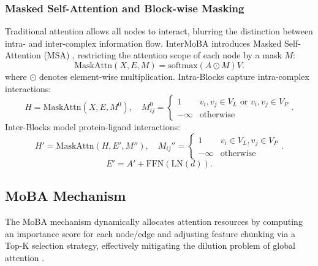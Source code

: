 \documentclass[11pt,a4paper]{article}
\theoremstyle{plain}
\theoremstyle{definition}
\begin{document}
\subsubsection{Masked Self-Attention and Block-wise Masking}
Traditional attention allows all nodes to interact, blurring the distinction between intra- and inter-complex information flow. InterMoBA introduces Masked Self-Attention (MSA) \cite{lee2018pre}, restricting the attention scope of each node by a mask $M$:
\begin{equation}
\text{MaskAttn}(X,E,M) = \text{softmax}(A \odot M)V.
\end{equation}
where $\odot$ denotes element-wise multiplication. Intra-Blocks capture intra-complex interactions:
\begin{equation}
H = \text{MaskAttn}(X,E,M^{0}),\quad
M_{ij}^{0} = \begin{cases} 1 & v_i,v_j \in V_L \text{ or } v_i,v_j \in V_P \\ -\infty & \text{otherwise} \end{cases}.
\end{equation}
Inter-Blocks model protein-ligand interactions:
\begin{equation}
H' = \text{MaskAttn}(H,E',M''),\quad
M_{ij}'' = \begin{cases} 1 & v_i \in V_L, v_j \in V_P \\ -\infty & \text{otherwise} \end{cases}.
\end{equation}
\begin{equation}
E' = A' + \text{FFN}(\text{LN}(d)).
\end{equation}


\subsection{MoBA Mechanism}
The MoBA mechanism dynamically allocates attention resources by computing an importance score for each node/edge and adjusting feature chunking via a Top-K selection strategy, effectively mitigating the dilution problem of global attention \cite{peng2024limitations}.
\end{document}
